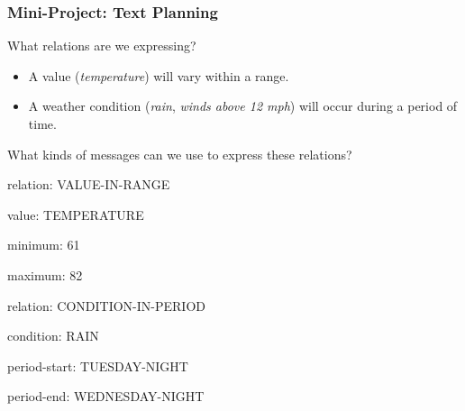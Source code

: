 \begin{frame}
\frametitle{Mini-Project: Text Planning}

What relations are we expressing?

\begin{itemize}
	\item A value (\textit{temperature}) will vary within a range.
	\item A weather condition (\textit{rain}, \textit{winds above 12 mph})
	will occur during a period of time.
\end{itemize}

\vspace{12pt}

What kinds of messages can we use to express these relations?

\vspace{12pt}

\begin{tcolorbox}[width=0.45\textwidth,nobeforeafter,title=Message]
	relation: VALUE-IN-RANGE
	
	value: TEMPERATURE
	
	minimum: 61
	
	maximum: 82
\end{tcolorbox}
\hfill
\begin{tcolorbox}[width=0.45\textwidth,nobeforeafter,title=Message]
	relation: CONDITION-IN-PERIOD
	
	condition: RAIN
	
	period-start: TUESDAY-NIGHT
	
	period-end: WEDNESDAY-NIGHT
\end{tcolorbox}


\end{frame}